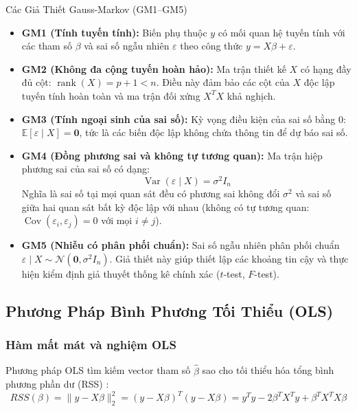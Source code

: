 \documentclass[12pt,a4paper]{article}
\begin{document}
\begin{assumptionbox}{Các Giả Thiết Gauss-Markov (GM1--GM5)}
\begin{itemize}
    \item \textbf{GM1 (Tính tuyến tính):} Biến phụ thuộc $y$ có mối quan hệ tuyến tính với các tham số $\beta$ và sai số ngẫu nhiên $\varepsilon$ theo công thức $y = X\beta + \varepsilon$.
    \item \textbf{GM2 (Không đa cộng tuyến hoàn hảo):} Ma trận thiết kế $X$ có hạng đầy đủ cột: $\operatorname{rank}(X) = p+1 < n$. Điều này đảm bảo các cột của $X$ độc lập tuyến tính hoàn toàn và ma trận đối xứng $X^T X$ khả nghịch.
    \item \textbf{GM3 (Tính ngoại sinh của sai số):} Kỳ vọng điều kiện của sai số bằng 0: $\mathbb{E}[\varepsilon \mid X] = \mathbf{0}$, tức là các biến độc lập không chứa thông tin để dự báo sai số.
    \item \textbf{GM4 (Đồng phương sai và không tự tương quan):} Ma trận hiệp phương sai của sai số có dạng:
    \begin{equation}
        \operatorname{Var}(\varepsilon \mid X) = \sigma^2 I_n
    \end{equation}
    Nghĩa là sai số tại mọi quan sát đều có phương sai không đổi $\sigma^2$ và sai số giữa hai quan sát bất kỳ độc lập với nhau (không có tự tương quan: $\operatorname{Cov}(\varepsilon_i, \varepsilon_j) = 0$ với mọi $i \neq j$).
    \item \textbf{GM5 (Nhiễu có phân phối chuẩn):} Sai số ngẫu nhiên phân phối chuẩn $\varepsilon \mid X \sim \mathcal{N}(\mathbf{0}, \sigma^2 I_n)$. Giả thiết này giúp thiết lập các khoảng tin cậy và thực hiện kiểm định giả thuyết thống kê chính xác ($t$-test, $F$-test).
\end{itemize}
\end{assumptionbox}

\subsection{Phương Pháp Bình Phương Tối Thiểu (OLS)}

\subsubsection{Hàm mất mát và nghiệm OLS}
Phương pháp OLS tìm kiếm vector tham số $\hat{\beta}$ sao cho tối thiểu hóa tổng bình phương phần dư (RSS) \cite{james}:
\begin{equation}
    RSS(\beta) = \|y - X\beta\|_2^2 = (y - X\beta)^T (y - X\beta) = y^T y - 2\beta^T X^T y + \beta^T X^T X \beta
\end{equation}
\end{document}
